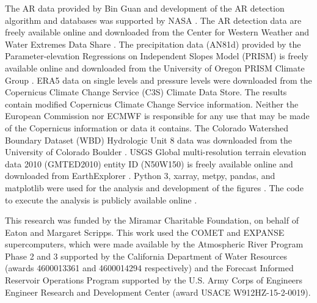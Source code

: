 \documentclass[draft]{agujournal2019}
\begin{document}
The AR data provided by Bin Guan and development of the AR detection algorithm and databases was supported by NASA \cite{Guan2022GlobalDataset}. The  AR detection data are freely available online and downloaded from the Center for Western Weather and Water Extremes Data Share \cite{Rutz2014RutzDataset}. The precipitation data (AN81d) provided by the Parameter-elevation Regressions on Independent Slopes Model (PRISM) is freely available online and downloaded from the University of Oregon PRISM Climate Group \cite{PRISMClimateGroup2004PRISMData}. ERA5 data on single levels \cite{Hersbach2018a} and pressure levels \cite{Hersbach2018} were downloaded from the Copernicus Climate Change Service (C3S) Climate Data Store. The results contain modified Copernicus Climate Change Service information. Neither the European Commission nor ECMWF is responsible for any use that may be made of the Copernicus information or data it contains. The Colorado Watershed Boundary Dataset (WBD) Hydrologic Unit 8 data was downloaded from the University of Colorado Boulder \cite{U.S.GeologicalSurvey2015ColoradoDataset}. USGS Global multi-resolution terrain elevation data 2010 (GMTED2010) entity ID (N50W150) is freely available online and downloaded from EarthExplorer \cite{Danielson2011GlobalDataset}. Python 3, xarray, metpy, pandas, and matplotlib were used for the analysis and development of the figures \cite{thomas_a_caswell_2022_6982547, 
 May2017, metpy, hoyer2017xarray, xarray_v2022.12.0, Hunter:2007, the_pandas_development_team_2022_7344967, VanRossum2009}. The code to execute the analysis is publicly available online \cite{Nash2024Dlnash/CO_top-decile_precipitation_ARs:Software}. 





\acknowledgments
This research was funded by the Miramar Charitable Foundation, on behalf of Eaton and Margaret Scripps. This work used the COMET and EXPANSE supercomputers, which were made available by the Atmospheric River Program Phase 2 and 3 supported by the California Department of Water Resources (awards 4600013361 and 4600014294 respectively) and the Forecast Informed Reservoir Operations Program supported by the U.S. Army Corps of Engineers Engineer Research and Development Center (award USACE W912HZ-15-2-0019).

\end{document}
